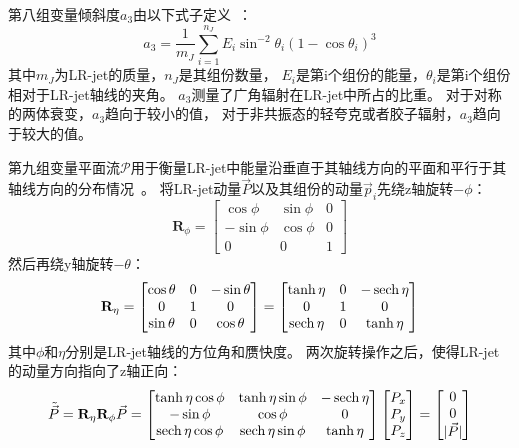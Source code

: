 第八组变量倾斜度$a_3$由以下式子定义~\cite{JSS13,JSA3}：
\begin{equation} 
\label{eq:JSS7}
a_3=\frac{1}{m_J} \sum_{i=1}^{n_J} E_i \sin^{-2} \theta_i (1-\cos \theta_i)^3
\end{equation}
其中$m_J$为LR-jet的质量，$n_J$是其组份数量，
$E_i$是第i个组份的能量，$\theta_i$是第i个组份相对于LR-jet轴线的夹角。
$a_3$测量了广角辐射在LR-jet中所占的比重。
对于对称的两体衰变，$a_3$趋向于较小的值，
对于非共振态的轻夸克或者胶子辐射，$a_3$趋向于较大的值。

第九组变量平面流$\mathcal{P}$用于衡量LR-jet中能量沿垂直于其轴线方向的平面和平行于其轴线方向的分布情况~\cite{JSS11}。
将LR-jet动量$\vec{P}$以及其组份的动量$\vec{p}_i$先绕z轴旋转$-\phi$：
\begin{equation} 
\label{eq:JSS8}
\mathbf{R}_{\phi}=
\begin{bmatrix}
\cos \phi & \sin\phi & 0\\
-\sin\phi & \cos\phi & 0\\
 0&0&1
\end{bmatrix}
\end{equation}
然后再绕y轴旋转$-\theta$：
\begin{equation} 
\label{eq:JSS9}
\mathbf{R}_{\eta}=
\begin{bmatrix}
\cos \theta & 0 & -\sin\theta\\
0 & 1 & 0\\
 \sin\theta&0& \cos\theta
\end{bmatrix}
=
\begin{bmatrix}
\tanh\eta & 0 & -\operatorname{sech}\eta\\
0 & 1 & 0\\
 \operatorname{sech}\eta&0& \tanh\eta
\end{bmatrix}
\end{equation}
其中$\phi$和$\eta$分别是LR-jet轴线的方位角和赝快度。
两次旋转操作之后，使得LR-jet的动量方向指向了z轴正向：
\begin{equation} 
\label{eq:JSS10}
\tilde{\vec{P}}=\mathbf{R}_{\eta}\mathbf{R}_{\phi}\vec{P}=
\begin{bmatrix}
\tanh\eta\cos \phi & \tanh\eta\sin\phi & -\operatorname{sech}\eta\\
-\sin\phi & \cos\phi & 0\\
  \operatorname{sech}\eta\cos\phi &\operatorname{sech}\eta\sin\phi & \tanh\eta
\end{bmatrix}
\begin{bmatrix}
P_x \\
P_y \\
P_z
\end{bmatrix}
=
\begin{bmatrix}
0 \\
0 \\
|\vec{P}|
\end{bmatrix}
\end{equation}
